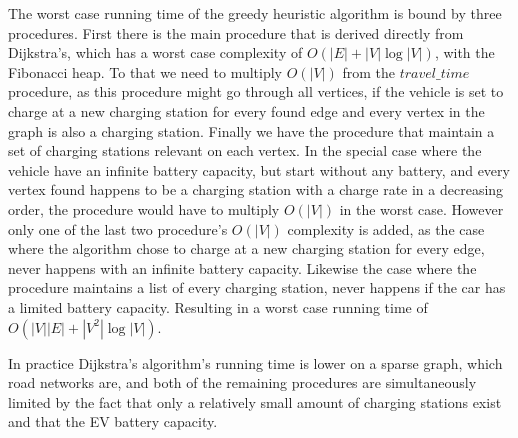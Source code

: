 The worst case running time of the greedy heuristic algorithm is bound by three procedures. First there is the main procedure that is derived directly from Dijkstra's, which has a worst case complexity of $O(|E|+|V|\log|V|)$, with the Fibonacci heap. To that we need to multiply $O(|V|)$ from the $travel\_time$ procedure, as this procedure might go through all vertices, if the vehicle is set to charge at a new charging station for every found edge and every vertex in the graph is also a charging station. Finally we have the procedure that maintain a set of charging stations relevant on each vertex. In the special case where the vehicle have an infinite battery capacity, but start without any battery, and every vertex found happens to be a charging station with a charge rate in a decreasing order, the procedure would have to multiply $O(|V|)$ in the worst case.
However only one of the last two procedure's $O(|V|)$ complexity is added, as the case where the algorithm chose to charge at a new charging station for every edge, never happens with an infinite battery capacity. Likewise the case where the procedure maintains a list of every charging station, never happens if the car has a limited battery capacity. Resulting in a worst case running time of $O(|V||E|+|V^2|\log|V|)$. %


In practice Dijkstra's algorithm's running time is lower on a sparse graph, which road networks are, and both of the remaining procedures are simultaneously limited by the fact that only a relatively small amount of charging stations exist and that the EV battery capacity.